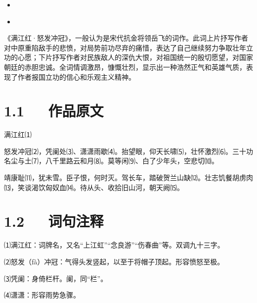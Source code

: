 \documentclass[letterpaper,12pt,english]{sphinxmanual}
\begin{document}
\begin{sphinxShadowBox}
\begin{itemize}
\begin{itemize}
\item {} 
\label{\detokenize{p01_u6563_u6587/_u5cb3_u98de-_u6ee1_u6c5f_u7ea2_xb7_u6012_u53d1_u51b2_u51a0:id16}}{\hyperref[\detokenize{p01_u6563_u6587/_u5cb3_u98de-_u6ee1_u6c5f_u7ea2_xb7_u6012_u53d1_u51b2_u51a0:id8}]{}}

\item {} 
\label{\detokenize{p01_u6563_u6587/_u5cb3_u98de-_u6ee1_u6c5f_u7ea2_xb7_u6012_u53d1_u51b2_u51a0:id17}}{\hyperref[\detokenize{p01_u6563_u6587/_u5cb3_u98de-_u6ee1_u6c5f_u7ea2_xb7_u6012_u53d1_u51b2_u51a0:id9}]{}}

\end{itemize}

\end{itemize}
\end{sphinxShadowBox}

《满江红·怒发冲冠》，一般认为是宋代抗金将领岳飞的词作。此词上片抒写作者对中原重陷敌手的悲愤，对局势前功尽弃的痛惜，表达了自己继续努力争取壮年立功的心愿；下片抒写作者对民族敌人的深仇大恨，对祖国统一的殷切愿望，对国家朝廷的赤胆忠诚。全词情调激昂，慷慨壮烈，显示出一种浩然正气和英雄气质，表现了作者报国立功的信心和乐观主义精神。


\section{1.1   作品原文}
\label{\detokenize{p01_u6563_u6587/_u5cb3_u98de-_u6ee1_u6c5f_u7ea2_xb7_u6012_u53d1_u51b2_u51a0:id3}}
满江红⑴

怒发冲冠⑵，凭阑处⑶、潇潇雨歇⑷。抬望眼，仰天长啸⑸，壮怀激烈⑹。三十功名尘与土⑺，八千里路云和月⑻。莫等闲⑼、白了少年头，空悲切⑽。

靖康耻⑾，犹未雪。臣子恨，何时灭。驾长车，踏破贺兰山缺⑿。壮志饥餐胡虏肉⒀，笑谈渴饮匈奴血⒁。待从头、收拾旧山河，朝天阙⒂。


\section{1.2   词句注释}
\label{\detokenize{p01_u6563_u6587/_u5cb3_u98de-_u6ee1_u6c5f_u7ea2_xb7_u6012_u53d1_u51b2_u51a0:id4}}
⑴满江红：词牌名，又名“上江虹”“念良游”“伤春曲”等。双调九十三字。

⑵怒发（fà）冲冠：气得头发竖起，以至于将帽子顶起。形容愤怒至极。

⑶凭阑：身倚栏杆。阑，同“栏”。

⑷潇潇：形容雨势急骤。
\end{document}
